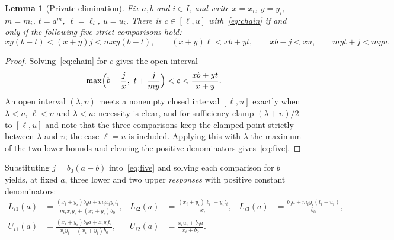 \documentclass[11pt,a4paper]{article}
\theoremstyle{plain}
\newtheorem{lemma}[theorem]{Lemma}
\theoremstyle{definition}
\theoremstyle{remark}
\begin{document}
\begin{lemma}[Private elimination]\label{lem:private}
Fix $a,b$ and $i\in I$, and write $x=x_i$, $y=y_i$, $m=m_i$, $t=a^{m}$, $\ell=\ell_i$, $u=u_i$. There is $c\in[\ell,u]$ with~\eqref{eq:chain} if and only if the following five strict comparisons hold:
\begin{equation}\label{eq:five}
xy(b-t)<(x+y)j<mxy(b-t),\qquad (x+y)\ell<xb+yt,\qquad xb-j<xu,\qquad myt+j<myu .
\end{equation}
\end{lemma}
\begin{proof}
Solving~\eqref{eq:chain} for $c$ gives the open interval
\[
\max\Bigl(b-\frac{j}{x},\ t+\frac{j}{my}\Bigr)<c<\frac{xb+yt}{x+y}.
\]
An open interval $(\lambda,\upsilon)$ meets a nonempty closed interval $[\ell,u]$ exactly when $\lambda<\upsilon$, $\ell<\upsilon$ and $\lambda<u$: necessity is clear, and for sufficiency clamp $(\lambda+\upsilon)/2$ to $[\ell,u]$ and note that the three comparisons keep the clamped point strictly between $\lambda$ and $\upsilon$; the case $\ell=u$ is included. Applying this with $\lambda$ the maximum of the two lower bounds and clearing the positive denominators gives~\eqref{eq:five}.
\end{proof}

Substituting $j=b_0(a-b)$ into~\eqref{eq:five} and solving each comparison for $b$ yields, at fixed $a$, three lower and two upper \emph{responses} with positive constant denominators:
\begin{align}
L_{i1}(a)&=\frac{(x_i+y_i)b_0a+m_ix_iy_it_i}{m_ix_iy_i+(x_i+y_i)b_0}, &
L_{i2}(a)&=\frac{(x_i+y_i)\ell_i-y_it_i}{x_i}, &
L_{i3}(a)&=\frac{b_0a+m_iy_i(t_i-u_i)}{b_0},\label{eq:lower}\\
U_{i1}(a)&=\frac{(x_i+y_i)b_0a+x_iy_it_i}{x_iy_i+(x_i+y_i)b_0}, &
U_{i2}(a)&=\frac{x_iu_i+b_0a}{x_i+b_0}. \label{eq:upper}
\end{align}
\end{document}
